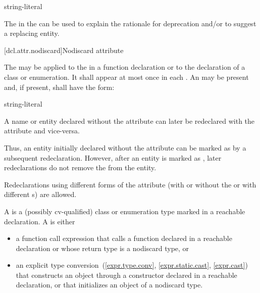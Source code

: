 \documentclass{wg21}
\begin{document}
\begin{ncbnf}
    \terminal{(} string-literal \terminal{)}
\end{ncbnf}

\begin{note}
    The  in the 
    can be used to explain the rationale for deprecation and/or to suggest a replacing entity.
\end{note}

[dcl.attr.nodiscard]{Nodiscard attribute}%

\pnum
The  
may be applied to the 
in a function declaration or to the declaration of a class or enumeration.
It shall appear at most once in each .
An  may be present
and, if present, shall have the form:

\begin{ncbnf}
    \terminal{(} string-literal \terminal{)}
\end{ncbnf}

\pnum
A name or entity declared without the  attribute
can later be redeclared with the attribute and vice-versa.
\begin{note}
    Thus, an entity initially declared without the attribute
    can be marked as 
    by a subsequent redeclaration.
    However, after an entity is marked as ,
    later redeclarations do not remove the 
    from the entity.
\end{note}
Redeclarations using different forms of the attribute
(with or without the 
or with different s)
are allowed.

\pnum
A  is
a (possibly cv-qualified) class or enumeration type
marked  in a reachable declaration.
A  is either
\begin{itemize}
    \item
    a function call expression
    that calls a function declared  in a reachable declaration or
    whose return type is a nodiscard type, or
    \item
    an explicit type
    conversion~(\ref{expr.type.conv}, \ref{expr.static.cast}, \ref{expr.cast})
    that constructs an object through
    a constructor declared  in a reachable declaration, or
    that initializes an object of a nodiscard type.
\end{itemize}
\end{document}
